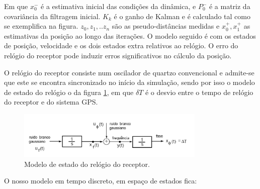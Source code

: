 \documentclass[palatino]{ist-report}
\begin{document}
Em que $x_0^-$ é a estimativa inicial das condições da dinâmica, e $P_0^-$ é a matriz da covariância da filtragem inicial. $K_k$ é o ganho de Kalman e é calculado tal como se exemplifica na figura. $z_0,z_1,..z_n$ são as pseudo-distâncias medidas e $x_0^+,x_1^+$ as estimativas da posição ao longo das iterações. O modelo seguido é com os estados de posição, velocidade e os dois estados extra relativos ao relógio. O erro do relógio do receptor pode induzir erros significativos no cálculo da posição. 

O relógio do receptor consiste num oscilador de quartzo convencional e admite-se que este se encontra sincronizado no início da simulação, sendo por isso o modelo de estado do relógio o da figura \ref{relogio}, em que $\delta T$ é o desvio entre o tempo de relógio do receptor e do sistema GPS.


\begin{figure}[ht]
	\centering
	\includegraphics[width=0.8\textwidth]{graphics/relogio.png}
	\caption{Modelo de estado do relógio do receptor.}
	\label{relogio}
\end{figure}


O nosso modelo em tempo discreto, em espaço de estados fica:
\end{document}
